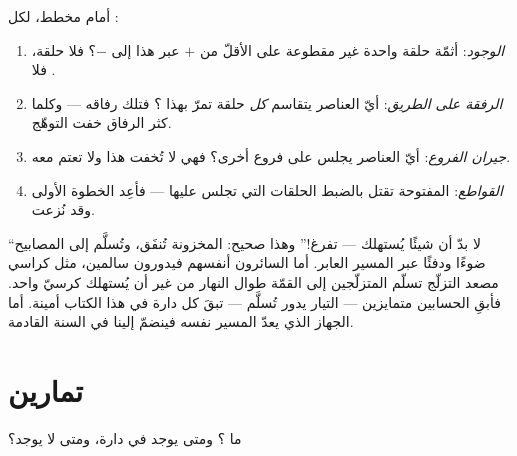 \begin{method}\label{met:g7:circuits-series-parallel:predict}
أمام مخطط، لكل :
\begin{enumerate}
  \item \emph{الوجود}: أثمّة حلقة واحدة غير مقطوعة على الأقلّ
        من $+$ عبر هذا  إلى $-$؟ فلا حلقة، فلا .
  \item \emph{الرفقة على الطريق}: أيّ العناصر يتقاسم \emph{كل}
        حلقة تمرّ بهذا ؟ فتلك رفاقه  ---
        وكلما كثر الرفاق خفت التوهّج.
  \item \emph{جيران الفروع}: أيّ العناصر يجلس على فروع أخرى؟
        فهي لا تُخفت هذا  ولا تعتم معه.
  \item \emph{القواطع}:  المفتوحة تقتل بالضبط الحلقات
        التي تجلس عليها --- فأعِد الخطوة الأولى وقد نُزعت.
\end{enumerate}
\end{method}

\begin{remark}\label{rem:g7:circuits-series-parallel:whyhard}
``لا بدّ أن شيئًا يُستهلك ---  تفرغ!'' وهذا صحيح:
  المخزونة تُنفَق، وتُسلَّم إلى المصابيح ضوءًا
ودفئًا عبر المسير العابر. أما السائرون أنفسهم فيدورون سالمين،
مثل كراسي مصعد التزلّج تسلّم المتزلّجين إلى القمّة طوال النهار
من غير أن يُستهلك كرسيّ واحد. فأبقِ الحسابين متمايزين ---
التيار يدور  تُسلَّم --- تبقَ كل دارة في هذا الكتاب
أمينة. أما الجهاز الذي يعدّ المسير نفسه فينضمّ إلينا في السنة
القادمة.
\end{remark}

\section{تمارين}

\begin{exercise}[$\star$]\label{exo:g7:circuits-series-parallel:1}
ما ؟ ومتى يوجد في دارة، ومتى لا يوجد؟
\end{exercise}

